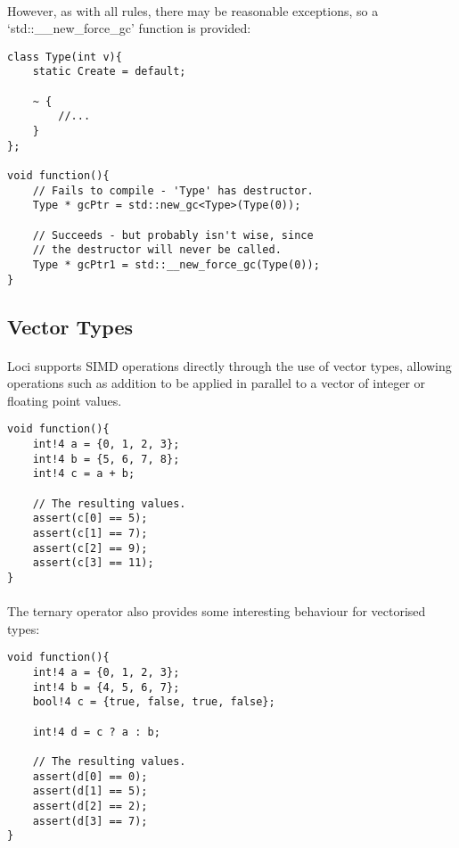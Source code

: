 \documentclass[12pt,twoside,notitlepage]{report}
\begin{document}
\paragraph{}
However, as with all rules, there may be reasonable exceptions, so a `std::\_\_new\_force\_gc' function is provided:


\begin{lstlisting}
class Type(int v){
	static Create = default;
	
	~ {
		//...
	}
};

void function(){
	// Fails to compile - 'Type' has destructor.
	Type * gcPtr = std::new_gc<Type>(Type(0));
	
	// Succeeds - but probably isn't wise, since 
	// the destructor will never be called.
	Type * gcPtr1 = std::__new_force_gc(Type(0));
}
\end{lstlisting}

\clearpage

\subsection{Vector Types}

\paragraph{}
Loci supports SIMD operations directly through the use of vector types, allowing operations such as addition to be applied in parallel to a vector of integer or floating point values.


\begin{lstlisting}
void function(){
	int!4 a = {0, 1, 2, 3};
	int!4 b = {5, 6, 7, 8};
	int!4 c = a + b;
	
	// The resulting values.
	assert(c[0] == 5);
	assert(c[1] == 7);
	assert(c[2] == 9);
	assert(c[3] == 11);
}
\end{lstlisting}


\paragraph{}
The ternary operator also provides some interesting behaviour for vectorised types:


\begin{lstlisting}
void function(){
	int!4 a = {0, 1, 2, 3};
	int!4 b = {4, 5, 6, 7};
	bool!4 c = {true, false, true, false};
	
	int!4 d = c ? a : b;
	
	// The resulting values.
	assert(d[0] == 0);
	assert(d[1] == 5);
	assert(d[2] == 2);
	assert(d[3] == 7);
}
\end{lstlisting}
\end{document}
